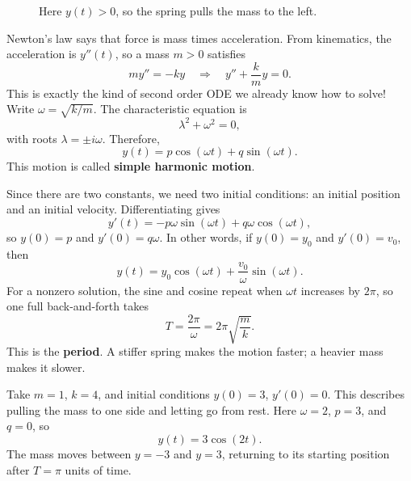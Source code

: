 \begin{figure}[h!]
\centering
{}
\caption{Here $y(t)>0$, so the spring pulls the mass to the left.}
\label{fig:simple-harmonic-oscillator}
\end{figure}

Newton's law says that force is mass times acceleration. From kinematics,
the acceleration is $y''(t)$, so a mass $m>0$ satisfies
$$my''=-ky
\quad\Longrightarrow\quad y''+\frac{k}{m}y=0.$$
This is exactly the kind of second order ODE we already know how to
solve! Write $\omega=\sqrt{k/m}$. The characteristic equation is
$$\lambda^2+\omega^2=0,$$
with roots $\lambda=\pm i\omega$. Therefore,
$$y(t)=p\cos(\omega t)+q\sin(\omega t).$$
This motion is called \textbf{simple harmonic motion}.

Since there are two constants, we need two initial conditions: an initial
position and an initial velocity. Differentiating gives
$$y'(t)=-p\omega\sin(\omega t)+q\omega\cos(\omega t),$$
so $y(0)=p$ and $y'(0)=q\omega$. In other words, if $y(0)=y_0$ and
$y'(0)=v_0$, then
$$y(t)=y_0\cos(\omega t)+\frac{v_0}{\omega}\sin(\omega t).$$
For a nonzero solution, the sine and cosine repeat when $\omega t$
increases by $2\pi$, so one full back-and-forth takes
$$T=\frac{2\pi}{\omega}=2\pi\sqrt{\frac{m}{k}}.$$
This is the \textbf{period}. A stiffer spring makes the motion faster;
a heavier mass makes it slower.

\begin{exampleblock}
Take $m=1$, $k=4$, and initial conditions $y(0)=3$, $y'(0)=0$.
This describes pulling the mass to one side and letting go from rest.
Here $\omega=2$, $p=3$, and $q=0$, so
$$y(t)=3\cos(2t).$$
The mass moves between $y=-3$ and $y=3$, returning to its starting
position after $T=\pi$ units of time.
\end{exampleblock}

